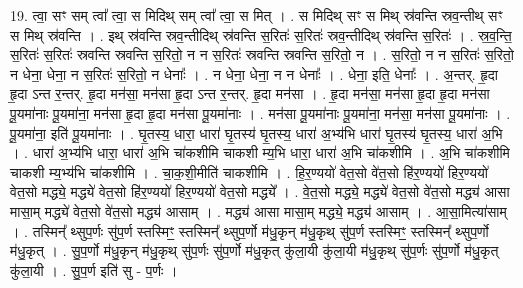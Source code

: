 \documentclass[17pt]{extarticle}
\begin{document}
19. त्वा॒ सꣳ सम् त्वा᳚ त्वा॒ स मिदिथ् सम् त्वा᳚ त्वा॒ स मित् । . स मिदिथ् सꣳ स मिथ् स्र॑वन्ति स्रव॒न्तीथ् सꣳ स मिथ् स्र॑वन्ति । . इथ् स्र॑वन्ति स्रव॒न्तीदिथ् स्र॑वन्ति स॒रितः॑ स॒रितः॑ स्रव॒न्तीदिथ् स्र॑वन्ति स॒रितः॑ । . स्र॒व॒न्ति॒ स॒रितः॑ स॒रितः॑ स्रवन्ति स्रवन्ति स॒रितो॒ न न स॒रितः॑ स्रवन्ति स्रवन्ति स॒रितो॒ न । . स॒रितो॒ न न स॒रितः॑ स॒रितो॒ न धेना॒ धेना॒ न स॒रितः॑ स॒रितो॒ न धेनाः᳚ । . न धेना॒ धेना॒ न न धेनाः᳚ । . धेना॒ इति॒ धेनाः᳚ । . अ॒न्तर्. हृ॒दा हृ॒दा ऽन्त र॒न्तर्. हृ॒दा मन॑सा॒ मन॑सा हृ॒दा ऽन्त र॒न्तर्. हृ॒दा मन॑सा । . हृ॒दा मन॑सा॒ मन॑सा हृ॒दा हृ॒दा मन॑सा पू॒यमा॑नाः पू॒यमा॑ना॒ मन॑सा हृ॒दा हृ॒दा मन॑सा पू॒यमा॑नाः । . मन॑सा पू॒यमा॑नाः पू॒यमा॑ना॒ मन॑सा॒ मन॑सा पू॒यमा॑नाः । . पू॒यमा॑ना॒ इति॑ पू॒यमा॑नाः । . घृ॒तस्य॒ धारा॒ धारा॑ घृ॒तस्य॑ घृ॒तस्य॒ धारा॑ अ॒भ्य॑भि धारा॑ घृ॒तस्य॑ घृ॒तस्य॒ धारा॑ अ॒भि । . धारा॑ अ॒भ्य॑भि धारा॒ धारा॑ अ॒भि चा॑कशीमि चाकशी म्य॒भि धारा॒ धारा॑ अ॒भि चा॑कशीमि । . अ॒भि चा॑कशीमि चाकशी म्य॒भ्य॑भि चा॑कशीमि । . चा॒क॒शी॒मीति॑ चाकशीमि । . हि॒र॒ण्ययो॑ वेत॒सो वे॑त॒सो हि॑र॒ण्ययो॑ हिर॒ण्ययो॑ वेत॒सो मद्ध्ये॒ मद्ध्ये॑ वेत॒सो हि॑र॒ण्ययो॑ हिर॒ण्ययो॑ वेत॒सो मद्ध्ये᳚ । . वे॒त॒सो मद्ध्ये॒ मद्ध्ये॑ वेत॒सो वे॑त॒सो मद्ध्य॑ आसा मासा॒म् मद्ध्ये॑ वेत॒सो वे॑त॒सो मद्ध्य॑ आसाम् । . मद्ध्य॑ आसा मासा॒म् मद्ध्ये॒ मद्ध्य॑ आसाम् । . आ॒सा॒मित्या॑साम् । . तस्मिन्᳚ थ्सुप॒र्णः सु॑प॒र्ण स्तस्मिꣳ॒॒ स्तस्मिन्᳚ थ्सुप॒र्णो म॑धु॒कृन् म॑धु॒कृथ् सु॑प॒र्ण स्तस्मिꣳ॒॒
स्तस्मिन्᳚ थ्सुप॒र्णो म॑धु॒कृत् । . सु॒प॒र्णो म॑धु॒कृन् म॑धु॒कृथ् सु॑प॒र्णः सु॑प॒र्णो म॑धु॒कृत् कु॑ला॒यी कु॑ला॒यी म॑धु॒कृथ् सु॑प॒र्णः सु॑प॒र्णो म॑धु॒कृत् कु॑ला॒यी । . सु॒प॒र्ण इति॑ सु - प॒र्णः । \newline
\end{document}
